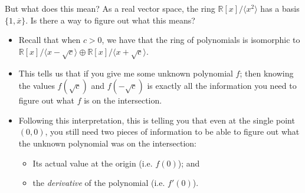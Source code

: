 \documentclass[aspectratio=169,10pt]{beamer}
\begin{document}
\begin{frame}{But what does this mean?}
    As a real vector space, the ring $\mathbb{R}[x]/\langle x^2\rangle$ has a basis $\{1, \overline{x}\}$. Is there a way to figure out what this means?

    \begin{itemize}
        \item Recall that when $c>0$, we have that the ring of polynomials is isomorphic to $\mathbb{R}[x]/\langle x-\sqrt{c}\rangle \oplus \mathbb{R}[x]/\langle x+\sqrt{c}\rangle$.
        \pause\item This tells us that if you give me some unknown polynomial $f$; then knowing the values $f(\sqrt{c})$ and $f(-\sqrt{c})$ is exactly all the information you need to figure out what $f$ is on the intersection.
        \pause\item Following this interpretation, this is telling you that even at the single point $(0,0)$, you still need two pieces of information to be able to figure out what the unknown polynomial was on the intersection:
        \begin{itemize}
            \item Its actual value at the origin (i.e. $f(0)$); and
            \item the \textit{derivative} of the polynomial (i.e. $f'(0)$).
        \end{itemize}
    \end{itemize}
\end{frame}
\end{document}
